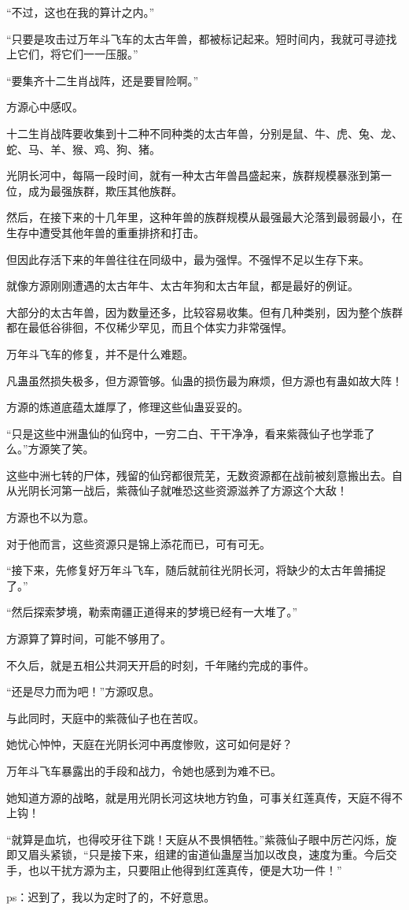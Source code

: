 \begin{this_body}
“不过，这也在我的算计之内。”

“只要是攻击过万年斗飞车的太古年兽，都被标记起来。短时间内，我就可寻迹找上它们，将它们一一压服。”

“要集齐十二生肖战阵，还是要冒险啊。”

方源心中感叹。

十二生肖战阵要收集到十二种不同种类的太古年兽，分别是鼠、牛、虎、兔、龙、蛇、马、羊、猴、鸡、狗、猪。

光阴长河中，每隔一段时间，就有一种太古年兽昌盛起来，族群规模暴涨到第一位，成为最强族群，欺压其他族群。

然后，在接下来的十几年里，这种年兽的族群规模从最强最大沦落到最弱最小，在生存中遭受其他年兽的重重排挤和打击。

但因此存活下来的年兽往往在同级中，最为强悍。不强悍不足以生存下来。

就像方源刚刚遭遇的太古年牛、太古年狗和太古年鼠，都是最好的例证。

大部分的太古年兽，因为数量还多，比较容易收集。但有几种类别，因为整个族群都在最低谷徘徊，不仅稀少罕见，而且个体实力非常强悍。

万年斗飞车的修复，并不是什么难题。

凡蛊虽然损失极多，但方源管够。仙蛊的损伤最为麻烦，但方源也有蛊如故大阵！

方源的炼道底蕴太雄厚了，修理这些仙蛊妥妥的。

“只是这些中洲蛊仙的仙窍中，一穷二白、干干净净，看来紫薇仙子也学乖了么。”方源笑了笑。

这些中洲七转的尸体，残留的仙窍都很荒芜，无数资源都在战前被刻意搬出去。自从光阴长河第一战后，紫薇仙子就唯恐这些资源滋养了方源这个大敌！

方源也不以为意。

对于他而言，这些资源只是锦上添花而已，可有可无。

“接下来，先修复好万年斗飞车，随后就前往光阴长河，将缺少的太古年兽捕捉了。”

“然后探索梦境，勒索南疆正道得来的梦境已经有一大堆了。”

方源算了算时间，可能不够用了。

不久后，就是五相公共洞天开启的时刻，千年赌约完成的事件。

“还是尽力而为吧！”方源叹息。

与此同时，天庭中的紫薇仙子也在苦叹。

她忧心忡忡，天庭在光阴长河中再度惨败，这可如何是好？

万年斗飞车暴露出的手段和战力，令她也感到为难不已。

她知道方源的战略，就是用光阴长河这块地方钓鱼，可事关红莲真传，天庭不得不上钩！

“就算是血坑，也得咬牙往下跳！天庭从不畏惧牺牲。”紫薇仙子眼中厉芒闪烁，旋即又眉头紧锁，“只是接下来，组建的宙道仙蛊屋当加以改良，速度为重。今后交手，也以干扰方源为主，只要阻止他得到红莲真传，便是大功一件！”

ps：迟到了，我以为定时了的，不好意思。

\end{this_body}

